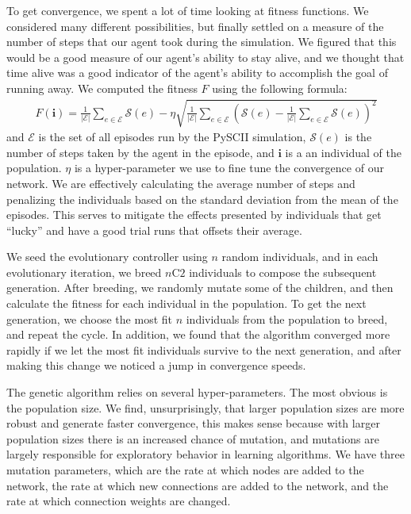 \documentclass{article}
\begin{document}
\begin{multicols}{2}
To get convergence, we spent a lot of time looking at fitness functions. We
considered many different
possibilities, but finally settled on a measure of the number of steps that our
agent took during the simulation. We figured that this would be a good measure
of our agent's ability to stay alive, and we thought that time alive was a good
indicator of the agent's ability to accomplish the goal of running away. We
computed the fitness $F$ using the following formula:
\begin{align}\label{eq:fitness}
  F(\bm{i}) = \frac{1}{|\bm{\mathcal{E}}|} \sum_{e \in \bm{\mathcal{E}}} \mathcal{S}(e) - \eta\sqrt{\frac{1}{|\bm{\mathcal{E}}|}
   \sum_{e \in \bm{\mathcal{E}}}\left(\mathcal{S}(e) - \frac{1}{|\bm{\mathcal{E}}|} \sum_{e \in \bm{\mathcal{E}}} \mathcal{S}(e)\right)^2} 
\end{align}
and $\bm{\mathcal{E}}$ is the set of all episodes run by the PySCII simulation,
$\mathcal{S}(e)$ is the number of steps taken by the agent in the episode, and
$\bm{i}$ is a an individual of the population. $\eta$ is a hyper-parameter we
use
to fine tune the convergence of our network. We are effectively calculating the
average number of steps and penalizing the individuals based on the standard
deviation from the mean of the episodes. This serves to mitigate the effects
presented by individuals that get ``lucky'' and have a good trial runs that
offsets their average.

We seed the evolutionary controller using $n$ random individuals, and in each
evolutionary iteration, we breed $n\text{C}2$ individuals to compose the
subsequent generation. After breeding, we randomly mutate some of the children,
and then calculate the fitness for each individual in the population. To get
the next generation, we choose the most fit $n$ individuals from the population
to breed, and repeat the cycle. In addition, we found that the algorithm
converged more rapidly if we let the most fit individuals survive to the next
generation, and after making this change we noticed a jump in convergence
speeds.

The genetic algorithm relies on several hyper-parameters. The most obvious is
the
population size. We find, unsurprisingly, that larger population sizes are more
robust and generate faster convergence, this makes sense because with larger
population sizes there is an increased chance of mutation, and mutations are
largely responsible for exploratory behavior in learning algorithms. We have
three mutation parameters, which are the rate at which nodes are added to the
network, the rate at which new connections are added to the network, and the
rate at which connection weights are changed.


\end{multicols}
\end{document}
